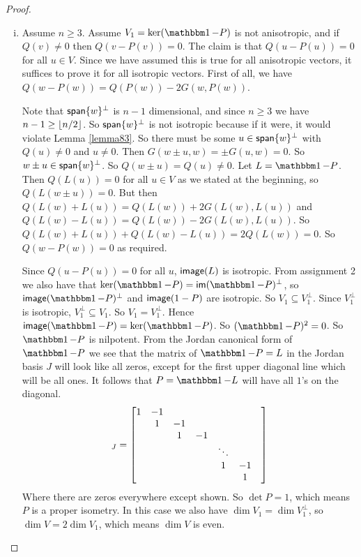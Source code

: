 \begin{proof}
\begin{enumerate}
{\begin{enumerate}[i)]
{    $n=2$. If $n=2$ and $V$ has an isotropic vector, then $V$ must be a hyperbolic plane. Let $\{u,v\}$ be a hyperbolic basis. Then $P$ is an isometry, we have $P : u \mapsto au$ and $P : v \mapsto bv$ or $P:u\mapsto av$ and $P:v\mapsto bu$. Consider the first one, where $P$ is diagonal. If $a=1$ then $P$ is just the identity. Otherwise, assume $a\neq 1$ and let $w=u+v$. Then $w-P(w) = u+v-au-a^{-1}v \neq 0$, so $Q(w) = 2$ and $Q(w-P(w))=2(1-a)(1-a^{-1})$. So case 2 holds. Now suppose $P$ swaps $u$ and $v$. Then $P=R_{u-av}$. Therefore we are done.
}
\item {
Assume $n\geq 3$. Assume $V_1 = \ker(\One-P)$ is not anisotropic, and if $Q(v)\neq 0$ then $Q(v-P(v))=0$. The claim is that $Q(u-P(u)) = 0$ for all $u\in V$. Since we have assumed this is true for all anisotropic vectors, it suffices to prove it for all isotropic vectors. First of all, we have $Q(w-P(w)) = Q(P(w)) - 2G(w,P(w))$.

Note that $\operatorname{\textsf{span}}\{w\}^\perp$ is $n-1$ dimensional, and since $n\geq 3$ we have $n-1\geq \lfloor n/2\rfloor$. So $\operatorname{\textsf{span}}\{w\}^\perp$ is not isotropic because if it were, it would violate Lemma \ref{lemma83}. So there must be some $u\in \operatorname{\textsf{span}}\{w\}^\perp$ with $Q(u)\neq 0$ and $u\neq 0$. Then $G(w\pm u,w) = \pm G(u,w) = 0$. So $w\pm u \in \operatorname{\textsf{span}}\{w\}^\perp$. So $Q(w\pm u) = Q(u)\neq 0$. Let $L = \One - P$. Then $Q(L(u)) = 0$ for all $u\in V$ as we stated at the beginning, so $Q(L(w\pm u)) =0 $. But then $Q(L(w)+L(u)) = Q(L(w))+2G(L(w),L(u))$ and $Q(L(w)-L(u))=Q(L(w))-2G(L(w),L(u))$. So $Q(L(w)+L(u))+Q(L(w)-L(u)) = 2Q(L(w))=0$. So $Q(w-P(w))=0$ as required.

Since $Q(u-P(u)) =0$ for all $u$, $\operatorname{\textsf{image}}(L)$ is isotropic. From assignment 2 we also have that $\ker (\One-P) = \im (\One-P)^\perp$, so $\image(\One-P)^\perp$ and $\operatorname{\textsf{image}}(1-P)$ are isotropic. So $V_1 \subseteq V_1^\perp$. Since $V_1^\perp$ is isotropic, $V_1^\perp \subseteq V_1$. So $V_1=V_1^\perp$. Hence $\image(\One-P) = \ker(\One-P)$. So $(\One-P)^2=0$. So $\One-P$ is nilpotent. From the Jordan canonical form of $\One-P$ we see that the matrix of $\One-P=L$ in the Jordan basis $J$ will look like all zeros, except for the first upper diagonal line which will be all ones. It follows that $P=\One-L$ will have all $1$'s on the diagonal.
\begin{equation}
[P]_J = 
\m{
1&-1&&&&\\
&1 &-1&&&\\
 &  &1&-1 &&\\
 &&&&\ddots&&\\
 &&&&1&-1\\
 &&&&&1
}
\end{equation}
Where there are zeros everywhere except shown.
So $\det P = 1$, which means $P$ is a proper isometry. In this case we also have $\dim V_1 = \dim V_1^\perp$, so $\dim V = 2\dim V_1$, which means $\dim V$ is even.

}
\end{enumerate}}
\end{enumerate}
\end{proof}
